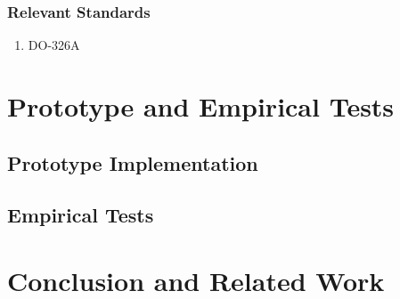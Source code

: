 \documentclass{article}
\theoremstyle{definition}
\theoremstyle{corollary}
\theoremstyle{lemma}
\theoremstyle{theorem}
\theoremstyle{theorem}
\begin{document}
\subsubsection{Relevant Standards}\label{sec:standards}
\begin{enumerate}[noitemsep]
	\item DO-326A
\end{enumerate}


\section{Prototype and Empirical Tests}\label{sec:prototest}
\subsection{Prototype Implementation}\label{sec:implementation}
\subsection{Empirical Tests}\label{sec:tests}

\section{Conclusion and Related Work}\label{sec:related}

\printbibliography
\end{document}
